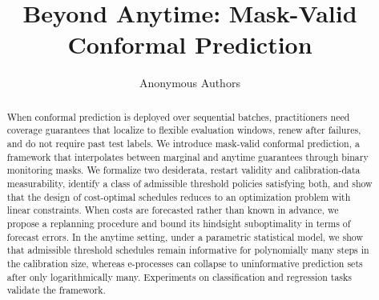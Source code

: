 \documentclass{uai2026} %
\title{Beyond Anytime: Mask-Valid Conformal Prediction}
\author[1]{Anonymous Authors}
\affil[1]{Anonymous Affiliation}
\newcommand{\1}{\mathbf{1}}
\newcommand{\prob}{\mathbb{P}}
\newcommand{\xcal}{\mathcal{X}}
\newcommand{\ycal}{\mathcal{Y}}
\newcommand{\scal}{\mathcal{S}}
\newcommand{\ens}[1]{\left\{#1\right\}}
\newcommand{\cali}{\mathrm{cal}}
\newcommand{\scalcal}{\scal_{\cali}}
\newcommand{\acal}{\mathcal{A}}
\begin{document}
\maketitle


\begin{abstract}
  When conformal prediction is deployed over sequential batches, practitioners need coverage guarantees that localize to flexible evaluation windows, renew after failures, and do not require past test labels. We introduce mask-valid conformal prediction, a framework that interpolates between marginal and anytime guarantees through binary monitoring masks. We formalize two desiderata, restart validity and calibration-data measurability, identify a class of admissible threshold policies satisfying both, and show that the design of cost-optimal schedules reduces to an optimization problem with linear constraints. When costs are forecasted rather than known in advance, we propose a replanning procedure and bound its hindsight suboptimality in terms of forecast errors. In the anytime setting, under a parametric statistical model, we show that admissible threshold schedules remain informative for polynomially many steps in the calibration size, whereas e-processes can collapse to uninformative prediction sets after only logarithmically many. Experiments on classification and regression tasks validate the framework.
\end{abstract}

%



\end{document}
